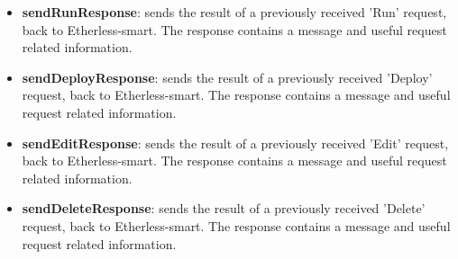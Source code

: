	\begin{itemize}
		\item \textbf{sendRunResponse}: sends the result of a previously received 'Run' request, back to Etherless-smart. The response contains a message and useful request related information.
		\item \textbf{sendDeployResponse}: sends the result of a previously received 'Deploy' request, back to Etherless-smart. The response contains a message and useful request related information.
		\item \textbf{sendEditResponse}: sends the result of a previously received 'Edit' request, back to Etherless-smart. The response contains a message and useful request related information.
		\item \textbf{sendDeleteResponse}: sends the result of a previously received 'Delete' request, back to Etherless-smart. The response contains a message and useful request related information.
	\end{itemize}
	
